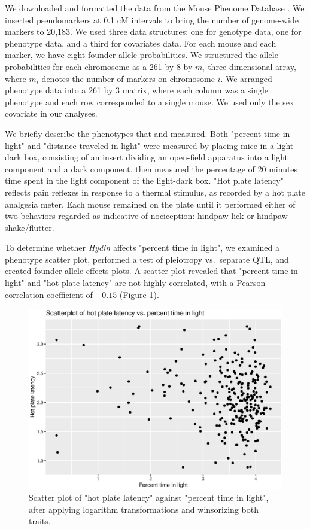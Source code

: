 \documentclass[12pt,twoside, lineno]{gsajnl}
\begin{document}
We downloaded and formatted the data from the Mouse Phenome Database
\citep{bogue2015collaborative}. We inserted pseudomarkers at 0.1 cM
intervals to bring the number of genome-wide markers to 20,183. We
used three data structures: one for genotype data, one for phenotype
data, and a third for covariates data. For each mouse and each marker,
we have eight founder allele probabilities. We structured the allele
probabilities for each chromosome as a 261 by 8 by $m_i$
three-dimensional array, where $m_i$ denotes the number of markers on
chromosome $i$. We arranged phenotype data into a 261 by 3 matrix,
where each column was a single phenotype and each row corresponded to
a single mouse. We used only the sex covariate in our analyses.

We briefly describe the phenotypes that \citet{logan2013high} and
\citet{recla2014precise} measured. Both "percent time in light" and
"distance traveled in light" were measured by placing mice in a
light-dark box, consisting of an insert dividing an open-field
apparatus into a light component and a dark component.
\citet{logan2013high} then measured the percentage of 20 minutes time
spent in the light component of the light-dark box. "Hot plate
latency" reflects pain reflexes in response to a thermal stimulus, as
recorded by a hot plate analgesia meter. Each mouse remained on the
plate until it performed either of two behaviors regarded as
indicative of nociception: hindpaw lick or hindpaw shake/flutter.




To determine whether \textit{Hydin} affects "percent time in light",
we examined a phenotype scatter plot, performed a test of pleiotropy
vs.\ separate QTL, and created founder allele effects plots. A scatter
plot revealed that "percent time in light" and "hot plate latency" are
not highly correlated, with a Pearson correlation coefficient of
$-0.15$ (Figure \ref{fig:scatter}).

\begin{figure}
\includegraphics[width = \textwidth]{../Rmd/scatter.eps}
\caption{Scatter plot of "hot plate latency" against "percent time in
  light", after applying logarithm transformations and winsorizing
  both traits.}
\label{fig:scatter}
\end{figure}
\end{document}
